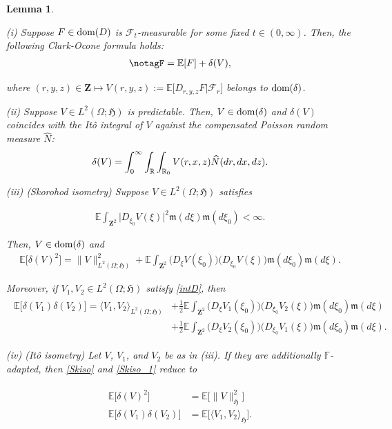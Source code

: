 \documentclass[letterpaper, 11pt,  reqno]{amsart}
\newcommand{\wh}{\widehat}
\newtheorem{lemma}[theorem]{Lemma}
\newcommand{\noi}{\noindent}
\newcommand{\R}{\mathbb{R}}
\newcommand{\bE}{\mathbb{E}}
\newcommand{\E}{\mathbb{E}}
\newcommand{\dl}{\delta}
\renewcommand{\O}{\Omega}
\newcommand{\fm}{\mathfrak{m}}
\newcommand{\fH}{\mathfrak{H}}
\newcommand{\dom}{\textup{dom}}
\numberwithin{equation}{section}
\numberwithin{theorem}{section}
\begin{document}
\begin{lemma}\label{lem25}

{\rm (i)}   
 Suppose $F\in\dom(D)$ is $\mathcal{F}_t$-measurable
for some fixed $t \in(0,\infty)$.
Then, the following Clark-Ocone formula holds:
\begin{align}
 \notag%
F = \E[F] + \dl(V),
\end{align}

\noi
where $  (r,y,z)\in \mathbf{Z} \mapsto  V(r, y, z) := \E\big[ D_{r, y, z} F | \mathcal{F}_r \big]$ 
belongs to $\dom(\dl)$.

\smallskip
\noi
{\rm (ii)}  Suppose $V\in L^2(\Omega; \fH)$ is  predictable.
 Then,
$V\in\dom(\dl)$ and
$\dl(V)$ coincides with the  It\^o integral of $V$ against the compensated Poisson random
measure $\wh{N}$:
\begin{align}  \notag%
\dl(V) = \int_0^\infty \int_{\R} \int_{\R_0} V(r, x, z) \wh{N}(dr, dx, dz).
\end{align}

\smallskip
\noi
{\rm (iii)} \textup{(Skorohod isometry)} Suppose  $V\in L^2(\Omega; \fH)$ satisfies 


\noi
\begin{align}\label{intD}
\E\int_{\mathbf{Z}^2} \big| D_{\xi_0} V(\xi) \big|^2 \fm(d\xi) \fm(d\xi_0) <\infty.
\end{align}

\noi
Then,  $V\in\dom(\dl)$  and 
\begin{align}\label{Skiso}
\E\big[ \dl(V)^2 \big] = \| V\|^2_{L^2(\O;\fH)} 
+ \E\int_{\mathbf{Z}^2} \big(  D_\xi V(\xi_0) \big)\big(  D_{\xi_0} V(\xi) \big) \fm(d\xi_0) \fm(d\xi).
\end{align}

\noi
Moreover, if $V_1, V_2 \in L^2(\O;\fH)$ satisfy \eqref{intD}, then
\begin{align} \label{Skiso_1}
\begin{aligned}
\E\big[ \dl(V_1)\dl(V_2) \big] = \langle V_1,V_2 \rangle_{L^2(\O;\fH)} 
&+ \frac{1}{2}\E\int_{\mathbf{Z}^2} \big(  D_\xi V_1(\xi_0) \big)\big(  D_{\xi_0} V_2(\xi) \big) 
\fm(d\xi_0) \fm(d\xi) \\   
& + \frac{1}{2}\E\int_{\mathbf{Z}^2} \big(  D_\xi V_2(\xi_0) \big)\big(  D_{\xi_0} V_1(\xi) \big) \fm(d\xi_0) \fm(d\xi).
\end{aligned}
\end{align}


\smallskip
\noi
{\rm (iv)} \textup{(It\^o isometry)} 
Let $V$, $V_1$, and $V_2$ be as in {\rm (iii)}. If they are 
 additionally   $\mathbb{F}$-adapted, then \eqref{Skiso} and \eqref{Skiso_1}
 reduce to 
 
\noi
\begin{align}
\begin{aligned} \label{Skiso_2}
\E\big[ \dl(V)^2 \big] &= \bE\big[\| V\|^2_{\fH}\big] \\
\E\big[ \dl(V_1)\dl(V_2)  \big] &= \bE\big[\langle V_1,V_2 \rangle_{\fH}\big].
\end{aligned}
\end{align}
\end{lemma}
\end{document}
